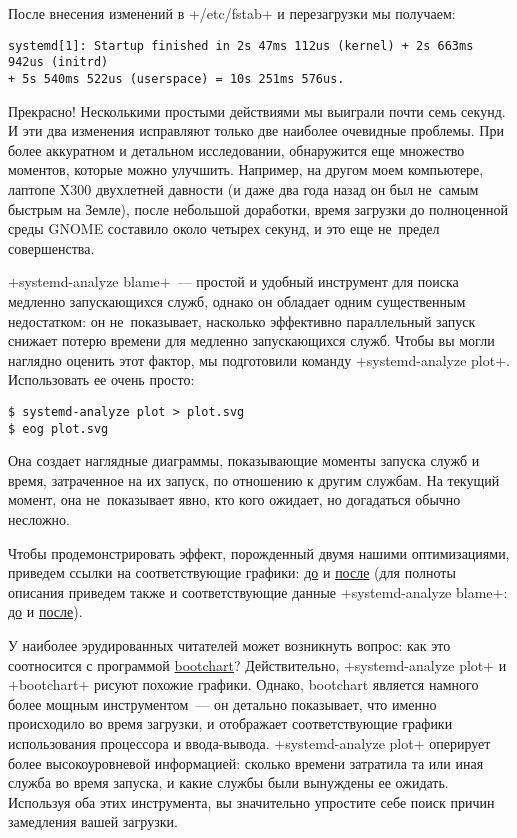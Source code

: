 \documentclass[10pt,oneside,a4paper]{article}
\begin{document}
После внесения изменений в +/etc/fstab+ и перезагрузки мы получаем:
\begin{Verbatim}
systemd[1]: Startup finished in 2s 47ms 112us (kernel) + 2s 663ms 942us (initrd)
+ 5s 540ms 522us (userspace) = 10s 251ms 576us.
\end{Verbatim}

Прекрасно! Несколькими простыми действиями мы выиграли почти семь секунд. И эти
два изменения исправляют только две наиболее очевидные проблемы. При более
аккуратном и детальном исследовании, обнаружится еще множество моментов, которые
можно улучшить. Например, на другом моем компьютере, лаптопе X300 двухлетней
давности (и даже два года назад он был не~самым быстрым на Земле), после
небольшой доработки, время загрузки до полноценной среды GNOME
составило около четырех секунд, и это еще не~предел совершенства.

+systemd-analyze blame+~--- простой и удобный инструмент для поиска медленно
запускающихся служб, однако он обладает одним существенным недостатком: он
не~показывает, насколько эффективно параллельный запуск снижает потерю времени
для медленно запускающихся служб. Чтобы вы могли наглядно оценить этот фактор,
мы подготовили команду +systemd-analyze plot+. Использовать ее очень просто:
\begin{Verbatim}
$ systemd-analyze plot > plot.svg
$ eog plot.svg
\end{Verbatim}

Она создает наглядные диаграммы, показывающие моменты запуска служб и время,
затраченное на их запуск, по отношению к другим службам. На текущий момент, она
не~показывает явно, кто кого ожидает, но догадаться обычно несложно.

Чтобы продемонстрировать эффект, порожденный двумя нашими оптимизациями,
приведем ссылки на соответствующие графики:
\href{http://0pointer.de/public/blame.svg}{до} и
\href{http://0pointer.de/public/blame2.svg}{после} (для полноты описания приведем также и
соответствующие данные +systemd-analyze blame+:
\href{http://0pointer.de/public/blame.txt}{до} и
\href{http://0pointer.de/public/blame2.txt}{после}).

У наиболее эрудированных читателей может возникнуть вопрос: как это соотносится с
программой \href{https://github.com/mmeeks/bootchart}{bootchart}? Действительно,
+systemd-analyze plot+ и +bootchart+ рисуют похожие графики. Однако, bootchart
является намного более мощным инструментом~--- он детально показывает, что
именно происходило во время загрузки, и отображает соответствующие графики
использования процессора и ввода-вывода. +systemd-analyze plot+ оперирует более
высокоуровневой информацией: сколько времени затратила та или иная служба во
время запуска, и какие службы были вынуждены ее ожидать. Используя оба этих
инструмента, вы значительно упростите себе поиск причин замедления вашей
загрузки.
\end{document}
